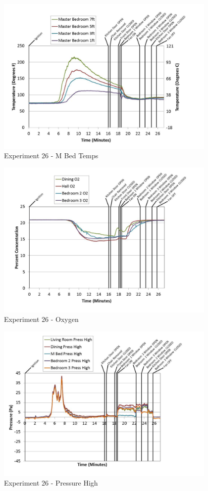 \documentclass{article}
\begin{document}
\begin{appendices}
	\begin{figure}[h!]
		\centering
		\includegraphics[height=3.05in]{0_Images/Results_Charts/Exp_26_Charts/MBedTemps.pdf}
		\caption{Experiment 26 - M Bed Temps}
	\end{figure}
 
	\clearpage

	\begin{figure}[h!]
		\centering
		\includegraphics[height=3.05in]{0_Images/Results_Charts/Exp_26_Charts/Oxygen.pdf}
		\caption{Experiment 26 - Oxygen}
	\end{figure}
 

	\begin{figure}[h!]
		\centering
		\includegraphics[height=3.05in]{0_Images/Results_Charts/Exp_26_Charts/PressureHigh.pdf}
		\caption{Experiment 26 - Pressure High}
	\end{figure}
 

\end{appendices}
\end{document}
